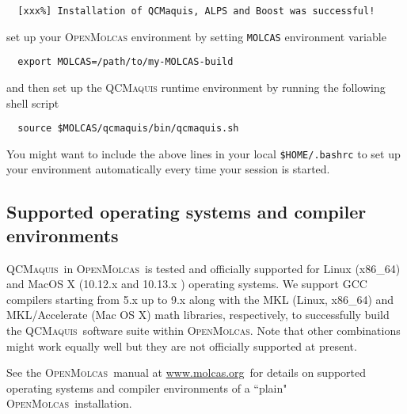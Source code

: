 \documentclass[bibliography=totoc,12pt,a4paper]{scrartcl}
\newcommand{\mol}{\textsc{OpenMolcas}}
\newcommand{\qcm}{\textsc{QCMaquis}}
\newcommand{\hostp}{\mol}
\begin{document}
\begin{verbatim}
  [xxx%] Installation of QCMaquis, ALPS and Boost was successful!
\end{verbatim}

set up your \mol{} environment by setting \texttt{MOLCAS} environment variable

\begin{verbatim}
  export MOLCAS=/path/to/my-MOLCAS-build
\end{verbatim}

and then set up the \qcm{} runtime environment by running the following shell script

\begin{verbatim}
  source $MOLCAS/qcmaquis/bin/qcmaquis.sh
\end{verbatim}

You might want to include the above lines in your local \texttt{\$HOME/.bashrc} to set up your environment automatically every time your session is started.

\subsection{Supported operating systems and compiler environments}\label{subsec:supportedOS}

\qcm\ in \hostp\ is tested and officially supported for Linux (x86\_64) and MacOS X (10.12.x and 10.13.x ) operating systems.
We support GCC compilers starting from 5.x up to 9.x along with the MKL (Linux, x86\_64) and MKL/Accelerate (Mac OS X) math libraries, respectively, to successfully build the \qcm\ software suite within \hostp.
Note that other combinations might work equally well but they are not officially supported at present.

\noindent See the \mol\ manual at \url{www.molcas.org}\ for details on supported operating systems and compiler environments of a ``plain" \mol\ installation.
\end{document}
